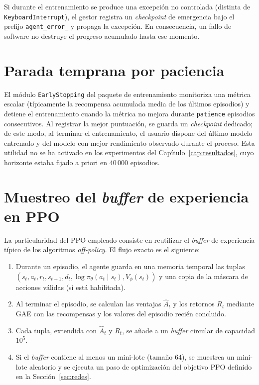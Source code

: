 Si durante el entrenamiento se produce una excepción no controlada
(distinta de \texttt{KeyboardInterrupt}), el gestor registra un
\textit{checkpoint} de emergencia bajo el prefijo
\texttt{agent\_error\_} y propaga la excepción. En consecuencia, un
fallo de software no destruye el progreso acumulado hasta ese momento.

\section{Parada temprana por paciencia}\label{apendice:early_stopping}
El módulo \texttt{EarlyStopping} del paquete de entrenamiento
monitoriza una métrica escalar (típicamente la recompensa acumulada
media de los últimos episodios) y detiene el entrenamiento cuando la
métrica no mejora durante \texttt{patience} episodios consecutivos. Al
registrar la mejor puntuación, se guarda un \textit{checkpoint}
dedicado; de este modo, al terminar el entrenamiento, el usuario
dispone del último modelo entrenado y del modelo con mejor rendimiento
observado durante el proceso. Esta utilidad no se ha activado en los
experimentos del Capítulo~\ref{cap:resultados}, cuyo horizonte estaba
fijado a priori en $40\,000$ episodios.

\section{Muestreo del \textit{buffer} de experiencia en PPO}\label{apendice:replay_buffer}
La particularidad del PPO empleado consiste en reutilizar el
\textit{buffer} de experiencia típico de los algoritmos
\textit{off-policy}. El flujo exacto es el siguiente:

\begin{enumerate}
    \item Durante un episodio, el agente guarda en una memoria
    temporal las tuplas $(s_t, a_t, r_t, s_{t+1}, d_t, \log\pi_\theta(a_t\mid s_t), V_\phi(s_t))$
    y una copia de la máscara de acciones válidas (si está habilitada).
    \item Al terminar el episodio, se calculan las ventajas $\hat{A}_t$
    y los retornos $R_t$ mediante GAE con las recompensas y los valores
    del episodio recién concluido.
    \item Cada tupla, extendida con $\hat{A}_t$ y $R_t$, se añade a un
    \textit{buffer} circular de capacidad $10^5$.
    \item Si el \textit{buffer} contiene al menos un mini-lote (tamaño
    $64$), se muestrea un mini-lote aleatorio y se ejecuta un paso de
    optimización del objetivo PPO definido en la
    Sección~\ref{sec:redes}.
\end{enumerate}

